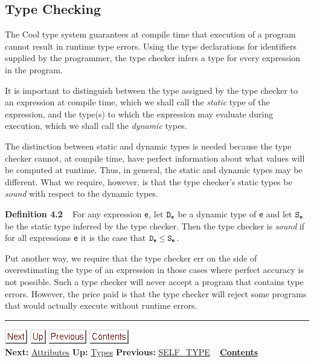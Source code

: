 \documentclass[]{article}
\begin{document}
\subsection{Type Checking}

The Cool type system guarantees at compile time that execution of a
program cannot result in runtime type errors. Using the type
declarations for identifiers supplied by the programmer, the type
checker infers a type for every expression in the program.

It is important to distinguish between the type assigned by the type
checker to an expression at compile time, which we shall call the
\emph{static} type of the expression, and the type(s) to which the
expression may evaluate during execution, which we shall call the
\emph{dynamic} types.

The distinction between static and dynamic types is needed because the
type checker cannot, at compile time, have perfect information about
what values will be computed at runtime. Thus, in general, the static
and dynamic types may be different. What we require, however, is that
the type checker's static types be \emph{sound} with respect to the
dynamic types.

\textbf{Definition 4.2} ~ For any expression \texttt{e}, let $\tt D_e$
be a dynamic type of \texttt{e} and let $\tt S_e$ be the static type
inferred by the type checker. Then the type checker is \emph{sound} if
for all expressions \texttt{e} it is the case that $\tt D_e \leq S_e$.

Put another way, we require that the type checker err on the side of
overestimating the type of an expression in those cases where perfect
accuracy is not possible. Such a type checker will never accept a
program that contains type errors. However, the price paid is that the
type checker will reject some programs that would actually execute
without runtime errors.

\begin{center}\rule{3in}{0.4pt}\end{center}

\href{node10.html}{\includegraphics{next.png}}
\href{node7.html}{\includegraphics{up.png}}
\href{node8.html}{\includegraphics{prev.png}}
\href{node1.html}{\includegraphics{contents.png}} \\ \textbf{Next:}
\href{node10.html}{Attributes} \textbf{Up:} \href{node7.html}{Types}
\textbf{Previous:} \href{node8.html}{SELF\_TYPE} ~
\textbf{\href{node1.html}{Contents}}
\end{document}
